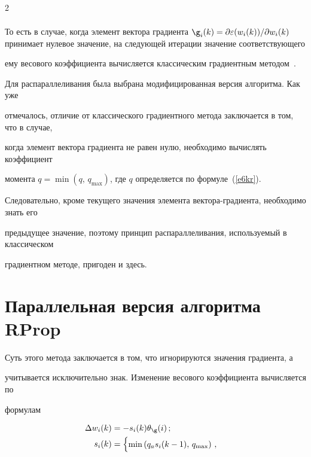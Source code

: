 \begin{multicols}{2}
\begin{align*}


\end{align*}


То есть в случае, когда элемент вектора градиента $\g_i(k) =\partial\varepsilon(w_i(k))/\partial


w_i(k)$ принимает нулевое значение, на следующей итерации значение со\-от\-вет\-ст\-ву\-юще\-го


ему весового коэффициента вычисляется классическим градиентным методом~\cite{6kr}.





 Для распараллеливания была выбрана модифицированная версия алгоритма. Как уже


отмечалось, отличие от классического градиентного метода заключается в том, что в случае,


когда элемент вектора градиента не равен нулю, необходимо вы\-чис\-лять коэффициент


момента $q=\min (q,\,q_{\max})$, где $q$ определяется по формуле~(\ref{e6kr}).


Следовательно, кроме текущего значения элемента вектора-градиента, необходимо знать его


предыдущее значение, поэтому принцип распараллеливания, ис\-поль\-зу\-емый в классическом


градиентном методе, пригоден и здесь.





\section{Параллельная версия алгоритма RProp}





 Суть этого метода заключается в том, что игнорируются значения градиента, а


учитывается исключительно знак. Изменение весового коэффициента вычисляется по


формулам~\cite{7kr, 9kr}


\begin{align*}


\Delta w_i(k) & =-s_i(k)\theta_{\g}(i)\,;\\


s_i(k) & =


\begin{cases}


\min \left( q_a s_i(k-1),\,q_{\max}\right)\,,\\



\end{cases}
\end{align*}
\end{multicols}
